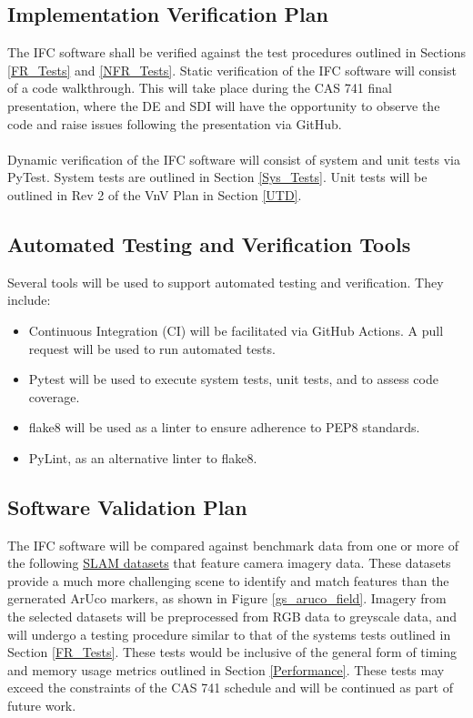 \documentclass[12pt, titlepage]{article}
\begin{document}
\subsection{Implementation Verification Plan}
The IFC software shall be verified against the test procedures outlined in Sections \ref{FR_Tests} and 
\ref{NFR_Tests}. Static verification of the IFC software will consist of a code walkthrough. This will take 
place during the CAS 741 final presentation, where the DE and SDI will have the opportunity to observe 
the code and raise issues following the presentation via GitHub. \\ \\
Dynamic verification of the IFC software will consist of system and unit tests via PyTest. System tests 
are outlined in Section \ref{Sys_Tests}. Unit tests will be outlined in Rev 2 of the VnV Plan in 
Section \ref{UTD}.

\subsection{Automated Testing and Verification Tools}
Several tools will be used to support automated testing and verification. They include:
\begin{itemize}
\item Continuous Integration (CI) will be facilitated via GitHub Actions. A pull request will be used 
to run automated tests.
\item Pytest will be used to execute system tests, unit tests, and to assess code coverage. 
\item flake8 will be used as a linter to ensure adherence to PEP8 standards. 
\item PyLint, as an alternative linter to flake8.
\end{itemize}

\subsection{Software Validation Plan}
The IFC software will be compared against benchmark data from one or more of the following 
\href{https://github.com/youngguncho/awesome-slam-datasets}{SLAM datasets} that feature camera imagery data. 
These datasets provide a much more challenging scene to identify and match features than the gernerated 
ArUco markers, as shown in Figure \ref{gs_aruco_field}. Imagery from the selected datasets will be preprocessed 
from RGB data to greyscale data, and will undergo a testing procedure similar to that of the systems tests 
outlined in Section \ref{FR_Tests}. These tests would be inclusive of the general form of timing and memory 
usage  metrics outlined in Section \ref{Performance}. These tests may exceed the constraints of the  CAS 
741 schedule and will be continued as part of future work.
\end{document}
